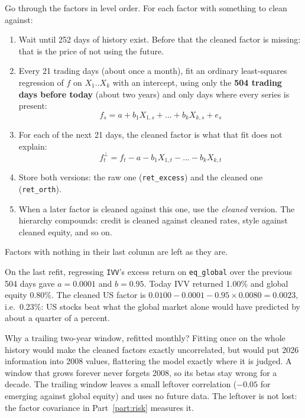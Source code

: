 \documentclass[11pt,a4paper]{article}
\newcommand{\fid}[1]{\texttt{#1}}
\begin{document}
\begin{method}
Go through the factors in level order. For each factor with something to clean
against:
\begin{enumerate}[leftmargin=1.4em]
  \item Wait until 252 days of history exist. Before that the cleaned factor is missing: that is the price of not using the future.
  \item Every 21 trading days (about once a month), fit an ordinary least-squares regression of $f$ on $X_1..X_k$ with an intercept, using only the \textbf{504 trading days before today} (about two years) and only days where every series is present:
  \[
    f_s = a + b_1 X_{1,s} + \dots + b_k X_{k,s} + e_s
  \]
  \item For each of the next 21 days, the cleaned factor is what that fit does not explain:
  \[
    f^{\perp}_t = f_t - a - b_1 X_{1,t} - \dots - b_k X_{k,t}
  \]
  \item Store both versions: the raw one (\texttt{ret\_excess}) and the cleaned one (\texttt{ret\_orth}).
  \item When a later factor is cleaned against this one, use the \emph{cleaned} version. The hierarchy compounds: credit is cleaned against cleaned rates, style against cleaned equity, and so on.
\end{enumerate}
Factors with nothing in their last column are left as they are.
\end{method}

\begin{example}
On the last refit, regressing \texttt{IVV}'s excess return on \fid{eq\_global} over the
previous 504 days gave $a = 0.0001$ and $b = 0.95$. Today IVV returned 1.00\% and
global equity 0.80\%. The cleaned US factor is
$0.0100 - 0.0001 - 0.95\times0.0080 = 0.0023$, i.e.\ 0.23\%: US stocks beat what
the global market alone would have predicted by about a quarter of a percent.
\end{example}

\begin{tip}
Why a trailing two-year window, refitted monthly? Fitting once on the whole history
would make the cleaned factors exactly uncorrelated, but would put 2026 information
into 2008 values, flattering the model exactly where it is judged. A window that
grows forever never forgets 2008, so its betas stay wrong for a decade. The trailing
window leaves a small leftover correlation ($-0.05$ for emerging against global
equity) and uses no future data. The leftover is not lost: the factor covariance in
Part~\ref{part:risk} measures it.
\end{tip}
\end{document}
